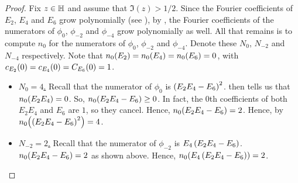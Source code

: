 \begin{proof}
    Fix $z \in \mathbb{H}$ and assume that $\Im(z) > 1/2$. Since the Fourier coefficients of $E_2$, $E_4$ and $E_6$ grow polynomially (see ), by , the Fourier coefficients of the numerators of $\phi_0$, $\phi_{-2}$ and $\phi_{-4}$ grow polynomially as well. All that remains is to compute $n_0$ for the numerators of $\phi_0$, $\phi_{-2}$ and $\phi_{-4}$. Denote these $N_0$, $N_{-2}$ and $N_{-4}$ respectively. Note that $n_0\!\left( E_2 \right) = n_0\!\left( E_4 \right) = n_0\!\left( E_6 \right) = 0$, with $c_{E_2}\!\left( 0 \right) = c_{E_4}\!\left( 0 \right) = C_{E_6}\!\left( 0 \right) = 1$.

    \begin{itemize}
        \item \underline{$N_0 = 4$.} Recall that the numerator of $\phi_0$ is $\left( E_2 E_4 - E_6 \right)^2$.  then tells us that $n_0\!\left( E_2 E_4 \right) = 0$. So, $n_0\!\left( E_2 E_4 - E_6 \right) \geq 0$. In fact, the $0$th coefficients of both $E_2 E_4$ and $E_6$ are $1$, so they cancel. Hence, $n_0\!\left( E_2 E_4 - E_6 \right) = 2$. Hence, by $n_0\!\left( \left( E_2 E_4 - E_6 \right)^2 \right) = 4$.
        
        \item \underline{$N_{-2} = 2$.} Recall that the numerator of $\phi_{-2}$ is $E_4\left( E_2 E_4 - E_6 \right)$. $n_0\!\left( E_2 E_4 - E_6 \right) = 2$ as shown above. Hence, $n_0\!\left( E_4\left( E_2 E_4 - E_6 \right) \right) = 2$.
        

\end{itemize}
\end{proof}
